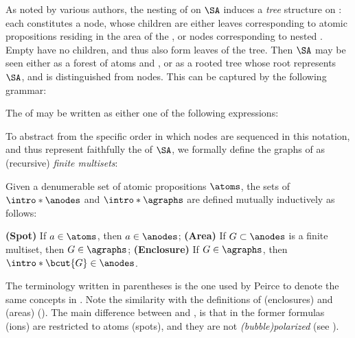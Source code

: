\begin{scope}
As noted by various authors, the nesting of  on $\SA$ induces a
\emph{tree} structure on : each  constitutes a node, whose children are
either leaves corresponding to atomic propositions residing in the area of the
, or nodes corresponding to nested . Empty  have no children, and
thus also form leaves of the tree. Then $\SA$ may be seen either as a forest of
atoms and , or as a rooted tree whose root represents $\SA$, and is
distinguished from  nodes. This can be captured by the following grammar:

\begin{example}
The  of  may be written as either one of the
following expressions:
\end{example}

To abstract from the specific order in which nodes are sequenced in this
notation, and thus represent faithfully the  of $\SA$, we formally
define the graphs of  as (recursive) \emph{finite multisets}:

\begin{scope}

\begin{definition}[Graph] 
  
  Given a denumerable set of atomic propositions $\atoms$, the sets of
   $\intro*\anodes$ and 
  $\intro*\agraphs$ are defined mutually inductively as follows:
  \begin{itemize}
    \itemAP \textbf{(Spot)} If $a \in \atoms$, then $a \in \anodes$;
    \itemAP \textbf{(Area)} If $G \subset \anodes$ is a finite multiset, then $G
    \in \agraphs$;
    \itemAP \textbf{(Enclosure)} If $G \in \agraphs$, then $\intro*\bcut{G} \in
    \anodes$.
  \end{itemize}
\end{definition}
The terminology written in parentheses is the one used by Peirce to denote the
same concepts in . Note the similarity with
the definitions of  (enclosures) and  (areas)
(). The main difference between  and , is
that in the former formulas (ions) are restricted to atoms (spots), and they are
not \emph{\kl(bubble){polarized}} (see ).


\end{scope}
\end{scope}
